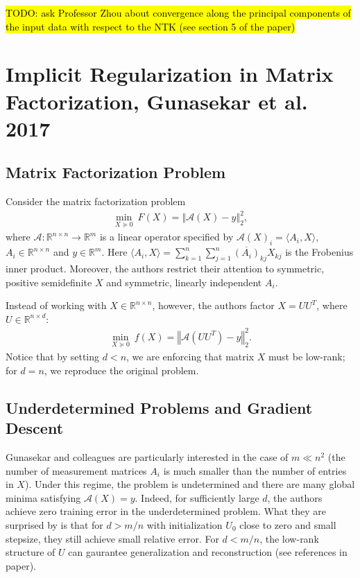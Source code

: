 \documentclass{article}
\begin{document}
\hl{TODO: ask Professor Zhou about convergence along the principal components of the input data with respect to the NTK (see section 5 of the paper)}

\section{Implicit Regularization in Matrix Factorization, Gunasekar et al. 2017}
\subsection{Matrix Factorization Problem}
Consider the matrix factorization problem
\begin{align*}
    \underset{X \succeq 0}{\min} \ F(X) = \left\Vert \mathcal{A}(X) - y \right\Vert_2^2,
\end{align*}
where $\mathcal{A}: \mathbb{R}^{n \times n} \rightarrow \mathbb{R}^m$ is a linear operator specified by $\mathcal{A}(X)_i = \langle A_i, X \rangle$, $A_i \in \mathbb{R}^{n \times n}$ and $y \in \mathbb{R}^m$. Here $\langle A_i, X \rangle = \sum_{k=1}^n \sum_{j=1}^n \overline{(A_i)}_{kj} X_{kj}$ is the Frobenius inner product. Moreover, the authors restrict their attention to symmetric, positive semidefinite $X$ and symmetric, linearly independent $A_i$.

Instead of working with $X \in \mathbb{R}^{n \times n}$, however, the authors factor $X = UU^T$, where $U \in \mathbb{R}^{n \times d}$:
\begin{align*}
    \underset{X \succeq 0}{\min} \ f(X) = \left\Vert \mathcal{A}(UU^T) - y \right\Vert_2^2.
\end{align*}
Notice that by setting $d < n$, we are enforcing that matrix $X$ must be low-rank; for $d = n$, we reproduce the original problem.

\subsection{Underdetermined Problems and Gradient Descent}
Gunasekar and colleagues are particularly interested in the case of $m \ll n^2$ (the number of measurement matrices $A_i$ is much smaller than the number of entries in $X$). Under this regime, the problem is undetermined and there are many global minima satisfying $\mathcal{A}(X) = y$. Indeed, for sufficiently large $d$, the authors achieve zero training error in the underdetermined problem. What they are surprised by is that for $d > m/n$ with initialization $U_0$ close to zero and small stepsize, they still achieve small relative error. For $d < m/n$, the low-rank structure of $U$ can gaurantee generalization and reconstruction (see references in paper). 
\end{document}

